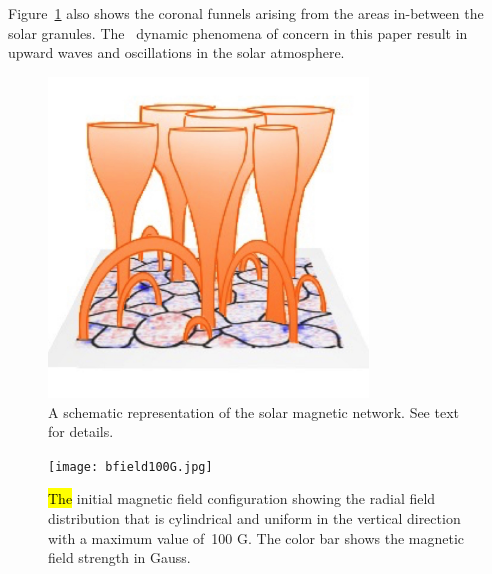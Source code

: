 \documentclass[physics,article,accept,pdftex,moreauthors]{Definitions/mdpi}
\begin{document}
  {Figure}~\ref{fig1} %
also shows the coronal funnels arising from the areas in-between the solar granules. The~ dynamic phenomena of concern in this paper result in  upward waves and oscillations in the solar atmosphere. 
\begin{figure}[H]
\includegraphics[width=8.5cm]{solar-network-v1.jpg}
\caption{{A schematic} %
 representation of the solar magnetic network. 
 {See text for details.} %
\label{fig1}}
\end{figure}
\unskip

\begin{figure}[H]
\texttt{[image: bfield100G.jpg]}
\caption{\hl{The} %
 initial magnetic field configuration showing the radial field distribution {%
 {that}%
} is cylindrical and uniform in the vertical direction with a maximum value of~100 G. The color bar shows the magnetic field strength in Gauss.\label{fig2}}%
\end{figure}
\end{document}
